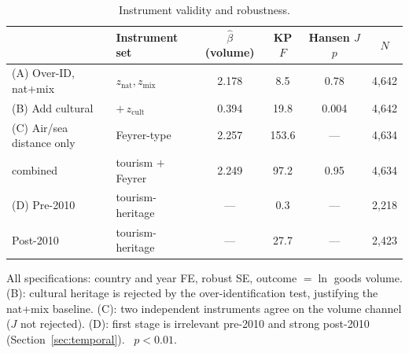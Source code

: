 \begin{table}[H]
\centering
\caption{Instrument validity and robustness.}
\label{tab:robust}
\begin{threeparttable}
\small
\begin{tabular}{llcccc}
\toprule
 & Instrument set & $\hat\beta$ (volume) & KP $F$ & Hansen $J$ $p$ & $N$ \\
\midrule
(A) Over-ID, nat+mix      & $z_{\text{nat}},z_{\text{mix}}$ & 2.178\sym{***} & 8.5 & 0.78 & 4{,}642 \\
(B) Add cultural          & $+\,z_{\text{cult}}$            & 0.394          & 19.8 & 0.004 & 4{,}642 \\
(C) Air/sea distance only & Feyrer-type                     & 2.257\sym{***} & 153.6 & --- & 4{,}634 \\
\quad combined            & tourism $+$ Feyrer              & 2.249\sym{***} & 97.2 & 0.95 & 4{,}634 \\
(D) Pre-2010              & tourism-heritage                & ---            & 0.3 & --- & 2{,}218 \\
\quad Post-2010           & tourism-heritage                & ---            & 27.7 & --- & 2{,}423 \\
\bottomrule
\end{tabular}
\begin{tablenotes}\small
\item All specifications: country and year FE, robust SE, outcome $=\ln$ goods
volume. (B): cultural heritage is rejected by the over-identification test,
justifying the nat+mix baseline. (C): two independent instruments agree on the
volume channel ($J$ not rejected). (D): first stage is irrelevant pre-2010 and
strong post-2010 (Section~\ref{sec:temporal}).
\sym{***}~$p<0.01$.
\end{tablenotes}
\end{threeparttable}
\end{table}

